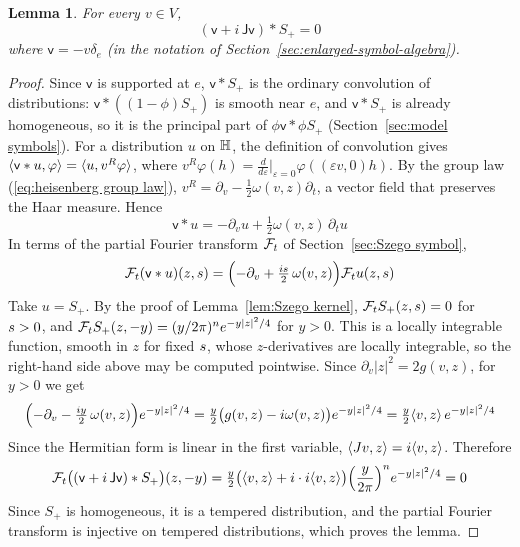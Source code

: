 \documentclass[11pt]{amsart}
\theoremstyle{plain}
\newtheorem{lemma}[theorem]{Lemma}
\theoremstyle{definition}
\theoremstyle{remark}
\begin{document}
\begin{lemma}\label{lem:dbar Szego}
For every $v\in V$,
\[ (\mathsf v+i\,\mathsf{Jv})*S_+=0\]
where $\mathsf v = -v \delta_e$ (in the notation of Section~\ref{sec:enlarged-symbol-algebra}).
\end{lemma}
\begin{proof}
Since $\mathsf v$ is supported at $e$, $\mathsf v*S_+$ is the ordinary convolution of distributions: $\mathsf v*((1-\phi)S_+)$ is smooth near $e$, and $\mathsf v*S_+$ is already homogeneous, so it is the principal part of $\phi\mathsf v*\phi S_+$ (Section~\ref{sec:model symbols}).
For a distribution $u$ on $\mathbb{H}$, the definition of convolution gives $\langle \mathsf v*u,\varphi \rangle=\langle u,v^R\varphi \rangle$, where $v^R\varphi(h)=\frac{d}{d\varepsilon}\big|_{\varepsilon=0}\varphi((\varepsilon v,0)h)$.
By the group law (\ref{eq:heisenberg group law}), $v^R=\partial_v-\frac12\omega(v,z)\partial_t$, a vector field that preserves the Haar measure.
Hence
\[ \mathsf v*u=-\partial_vu+\tfrac12\omega(v,z)\,\partial_tu\]
In terms of the partial Fourier transform ${\mathcal{F}}_t$ of Section~\ref{sec:Szego symbol},
\[ {\mathcal{F}}_t(\mathsf v*u)(z,s)=\Bigl(-\partial_v+\tfrac{is}{2}\,\omega(v,z)\Bigr){\mathcal{F}}_tu(z,s)\]
Take $u=S_+$.
By the proof of Lemma~\ref{lem:Szego kernel}, ${\mathcal{F}}_tS_+(z,s)=0$ for $s>0$, and ${\mathcal{F}}_tS_+(z,-y)=(y/2\pi)^ne^{-y|z|^2/4}$ for $y>0$.
This is a locally integrable function, smooth in $z$ for fixed $s$, whose $z$-derivatives are locally integrable, so the right-hand side above may be computed pointwise.
Since $\partial_v|z|^2=2g(v,z)$, for $y>0$ we get
\[ \Bigl(-\partial_v-\tfrac{iy}{2}\,\omega(v,z)\Bigr)e^{-y|z|^2/4}=\tfrac y2\bigl(g(v,z)-i\omega(v,z)\bigr)e^{-y|z|^2/4}=\tfrac y2\langle v,z \rangle\,e^{-y|z|^2/4}\]
Since the Hermitian form is linear in the first variable, $\langle Jv,z \rangle=i\langle v,z \rangle$.
Therefore
\[ {\mathcal{F}}_t\bigl((\mathsf v+i\,\mathsf{Jv})*S_+\bigr)(z,-y)=\tfrac y2\bigl(\langle v,z \rangle+i\cdot i\langle v,z \rangle\bigr)\Bigl(\frac{y}{2\pi}\Bigr)^ne^{-y|z|^2/4}=0\]
Since $S_+$ is homogeneous, it is a tempered distribution, and the partial Fourier transform is injective on tempered distributions, which proves the lemma.

\end{proof}
\end{document}
